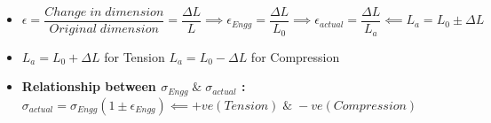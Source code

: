 \documentclass[8pt]{article}
\begin{document}
	\begin{itemize}
		\item $\boxed{\epsilon=\dfrac{Change\;in\;dimension}{Original\;dimension}=\dfrac{\Delta L}{L}}\implies \boxed{\epsilon_{Engg}=\dfrac{\Delta L}{L_0}} \implies \boxed{\epsilon_{actual}=\dfrac{\Delta L}{L_a}} \impliedby \boxed{L_{a}=L_0\pm\Delta L}$
		\item $L_a=L_0+\Delta L$ for Tension \hspace{1cm}$L_a=L_0-\Delta L$ for Compression
		\item \textbf{Relationship between $\sigma_{Engg}\;\&\;\sigma_{actual}$ : }$\boxed{\sigma_{actual}=\sigma_{Engg}(1\pm\epsilon_{Engg})}\impliedby +ve(Tension)\;\&\;-ve(Compression)$
	\end{itemize}\hrulefill\\\\
\end{document}
